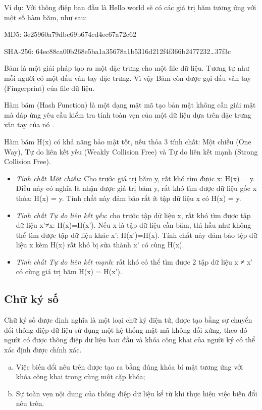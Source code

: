 Ví dụ: Với thông điệp ban đầu là Hello world sẽ có các giá trị băm tương ứng với một số hàm băm, như sau:

MD5: 3e25960a79dbc69b674cd4ec67a72c62

SHA-256: 64ec88ca00b268e5ba1a35678a1b5316d212f4f366b2477232\ldots 37f3c

Băm là một giải pháp tạo ra một đặc trưng cho một file dữ liệu. Tương tự như mỗi người có một dấu vân tay đặc trưng. Vì vậy Băm còn được gọi dấu vân tay (Fingerprint) của file dữ liệu.

Hàm băm (Hash Function) là một dạng mật mã tạo bản mật không cần giải mật mà đáp ứng yêu cầu kiểm tra tính toàn vẹn của một dữ liệu dựa trên đặc trưng vân tay của nó \cite{phạmnguyênkhang2013}.

Hàm băm H(x) có khả năng bảo mật tốt, nếu thỏa 3 tính chất: 
Một chiều (One Way),  Tự do liên kết yếu (Weakly Collision Free) và Tự do liên kết mạnh (Strong Collision Free).

\begin{itemize}
\item \emph{Tính chất Một chiều}: Cho trước giá trị băm y, rất khó tìm được x: H(x) = y. Điều này có nghĩa là nhận được giá trị băm y, rất khó tìm được dữ liệu gốc x thỏa: H(x) = y. Tính chất này đảm bảo rất ít tập dữ liệu x có H(x) = y.

\item \emph{Tính chất Tự do liên kết yếu}: cho trước tập dữ liệu x, rất khó tìm được tập dữ liệu x’≠x: H(x)=H(x’). Nếu x là tập dữ liệu cần băm, thì hầu như không thể tìm được tập dữ liệu khác x’: H(x’)=H(x). Tính chất này đảm bảo tệp dữ liệu x kèm H(x) rất khó bị sửa thành x’ có cùng H(x).

\item \emph{Tính chất Tự do liên kết mạnh}: rất khó có thể tìm được 2 tập dữ liệu x ≠ x’ có cùng giá trị băm H(x) = H(x’).
\end{itemize}

\subsection{Chữ ký số}
Chữ ký số được định nghĩa là một loại chữ ký điện tử, được tạo bằng sự chuyển đổi thông điệp dữ liệu sử dụng một hệ thống mật mã không đối xứng, theo đó người có được thông điệp dữ liệu ban đầu và khóa công khai của người ký có thể xác định được chính xác.

\begin{enumerate}[a)]
\item Việc biến đổi nêu trên được tạo ra bằng đúng khóa bí mật tương ứng với khóa công khai trong cùng một cặp khóa;
\item Sự toàn vẹn nội dung của thông điệp dữ liệu kể từ khi thực hiện việc biến đổi nêu trên.
\end{enumerate}


